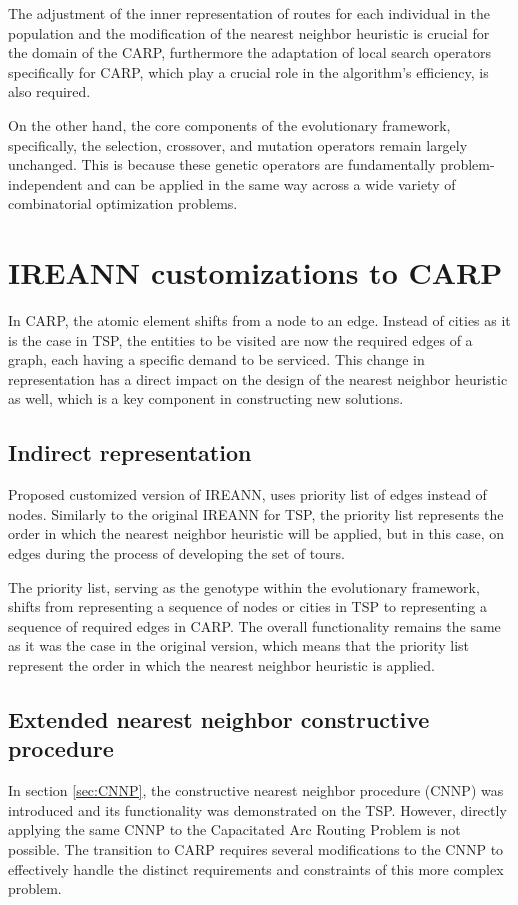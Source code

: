 \documentclass[twoside]{ctuthesis}
\theoremstyle{plain}
\theoremstyle{definition}
\theoremstyle{note}
\begin{document}
The adjustment of the inner representation of routes for each individual in the population and the modification of the nearest neighbor heuristic is crucial for the domain of the CARP, furthermore the adaptation of local search operators specifically for CARP, which play a crucial role in the algorithm's efficiency, is also required.

On the other hand, the core components of the evolutionary framework, specifically, the selection, crossover, and mutation operators remain largely unchanged. This is because these genetic operators are fundamentally problem-independent and can be applied in the same way across a wide variety of combinatorial optimization problems.

\section{IREANN customizations to CARP}
In CARP, the atomic element shifts from a node to an edge. Instead of cities as it is the case in TSP, the entities to be visited are now the required edges of a graph, each having a specific demand to be serviced. This change in representation has a direct impact on the design of the nearest neighbor heuristic as well, which is a key component in constructing new solutions.

\subsection{Indirect representation}
\label{sec:indirectcarp}
Proposed customized version of IREANN, uses priority list of edges instead of nodes. Similarly to the original IREANN \cite{kubalik2014novel} for TSP, the priority list represents the order in which the nearest neighbor heuristic will be applied, but in this case, on edges during the process of developing the set of tours.

The priority list, serving as the genotype within the evolutionary framework, shifts from representing a sequence of nodes or cities in TSP to representing a sequence of required edges in CARP. The overall functionality remains the same as it was the case in the original version, which means that the priority list represent the order in which the nearest neighbor heuristic is applied.

\subsection{Extended nearest neighbor constructive procedure}
\label{sec:CNNPCARP}
In section \ref{sec:CNNP}, the constructive nearest neighbor procedure (CNNP) was introduced and its functionality was demonstrated on the TSP. However, directly applying the same CNNP to the Capacitated Arc Routing Problem is not possible. The transition to CARP requires several modifications to the CNNP to effectively handle the distinct requirements and constraints of this more complex problem.
\end{document}
